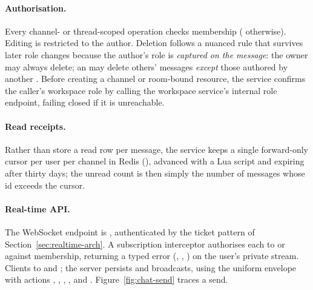 \paragraph{Authorisation.} Every channel- or thread-scoped operation checks
membership ( otherwise). Editing is restricted to the author. Deletion
follows a nuanced rule that survives later role changes because the author's role
is \emph{captured on the message}: the owner may always delete; an 
may delete others' messages \emph{except} those authored by another .
Before creating a channel or room-bound resource, the service confirms the
caller's workspace role by calling the workspace service's internal role
endpoint, failing closed if it is unreachable.

\paragraph{Read receipts.} Rather than store a read row per message, the service
keeps a single forward-only cursor per user per channel in Redis
(), advanced with a Lua script and expiring
after thirty days; the unread count is then simply the number of messages whose
id exceeds the cursor.

\paragraph{Real-time API.} The WebSocket endpoint is ,
authenticated by the ticket pattern of Section~\ref{sec:realtime-arch}. A
subscription interceptor authorises each  to
 or  against membership,
returning a typed error (, ,
) on the user's private  stream.
Clients  to  and ; the
server persists and broadcasts, using the uniform envelope with actions
, , ,
, and . Figure~\ref{fig:chat-send} traces a
send.

